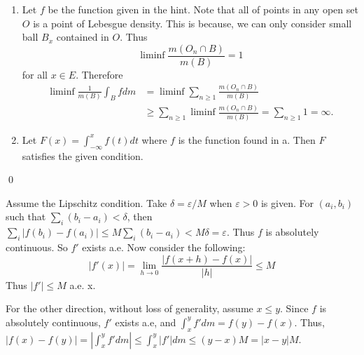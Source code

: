 \begin{exercise}[3.25] \hfill
	\begin{enumerate}[label = (\alph*)]
		\item Let $f$ be the function given in the hint.
			Note that all of points in any open set $O$ is a point of Lebesgue density.
			This is because, we can only consider small ball $B_x$ contained in $O$.
			Thus
			\[
				\liminf \frac{m(O_n \cap B)}{m(B)} = 1
			\]
			for all $x \in E$.
			Therefore
			\[
				\begin{split}
					\liminf \frac{1}{m(B)}\int_B f dm
					&= \liminf \sum_{n\ge 1}\frac{m(O_n \cap B)}{m(B)} \\
					&\ge \sum_{n \ge 1} \liminf \frac{m(O_n \cap B)}{m(B)} = \sum_{n\ge 1} 1 = \infty.
				\end{split}
			\]
			 
		\item Let $F(x) = \int_{-\infty}^x f(t) dt$ where $f$ is the function found in a.
			Then $F$ satisfies the given condition.
	\end{enumerate}
	\qed
\end{exercise}
\begin{exercise}[3.32] \hfill
	
	Assume the Lipschitz condition. Take $\delta = \varepsilon /M$ when $\varepsilon>0$ is given.
	For $(a_i, b_i)$ such that $\sum_i (b_i - a_i) < \delta$,
	then $\sum_i |f(b_i) - f(a_i)| \leq M\sum_i (b_i - a_i) < M \delta = \varepsilon$.
	Thus $f$ is absolutely continuous. So $f'$ exists a.e.
	Now consider the following:
	\[
		|f'(x)| = \lim_{h\rightarrow 0} \frac{|f(x+h)-f(x)|}{|h|} \leq M
	\]
	Thus $|f'| \leq M$ a.e. x.

	For the other direction, without loss of generality, assume $x\leq y$.
	Since $f$ is absolutely continuous, $f'$ exists a.e, and $\int_x^y f' dm = f(y) - f(x)$.
	Thus, $|f(x) - f(y) | = \left | \int_x^y f' dm \right | \leq \int_x^y |f'| dm \leq (y-x)M = |x-y|M$.

\end{exercise}

